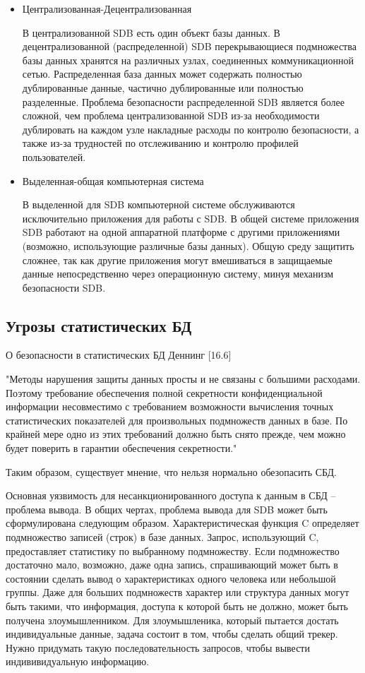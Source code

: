 \begin{itemize}
    \item Централизованная-Децентрализованная

В централизованной SDB есть один объект базы данных. В децентрализованной (распределенной) SDB перекрывающиеся подмножества базы данных хранятся на различных узлах, соединенных коммуникационной сетью. Распределенная база данных может содержать полностью дублированные данные, частично дублированные или полностью разделенные. Проблема безопасности распределенной SDB является более сложной, чем проблема централизованной SDB из-за необходимости дублировать на каждом узле накладные расходы по контролю безопасности, а также из-за трудностей по отслеживанию и контролю профилей пользователей.

	\item Выделенная-общая компьютерная система

В выделенной для SDB компьютерной системе обслуживаются исключительно приложения для работы с SDB. В общей системе приложения SDB работают на одной аппаратной платформе с другими приложениями (возможно, использующие различные базы данных). Общую среду защитить сложнее, так как другие приложения могут вмешиваться в защищаемые данные непосредственно через операционную систему, минуя механизм безопасности SDB.
\end{itemize}
\subsection{Угрозы статистических БД}

О безопасности в статистических БД  Деннинг [16.6]
\begin{grayquote}
"Методы нарушения защиты данных просты и не связаны с большими расходами. Поэтому требование обеспечения полной секретности конфиденциальной информации несовместимо с требованием возможности вычисления точных статистических показателей для произвольных подмножеств данных в базе. По крайней мере одно из этих требований должно быть снято прежде, чем можно будет поверить в гарантии обеспечения секретности."
\end{grayquote}
Таким образом, существует мнение, что нельзя нормально обезопасить СБД.

Основная уязвимость для несанкционированного доступа к данным в СБД -- проблема вывода.
В общих чертах, проблема вывода для SDB может быть сформулирована следующим образом. Характеристическая функция C определяет подмножество записей (строк) в базе данных. Запрос, использующий C, предоставляет статистику по выбранному подмножеству. Если подмножество достаточно мало, возможно, даже одна запись, спрашивающий может быть в состоянии сделать вывод о характеристиках одного человека или небольшой группы. Даже для больших подмножеств характер или структура данных могут быть такими, что информация, доступа к которой быть не должно, может быть получена злоумышленником.
Для злоумышленика, который пытается достать индивидуальные данные, задача состоит в том, чтобы сделать общий трекер.
Нужно придумать такую последовательность запросов, чтобы вывести индививидуальную информацию.


